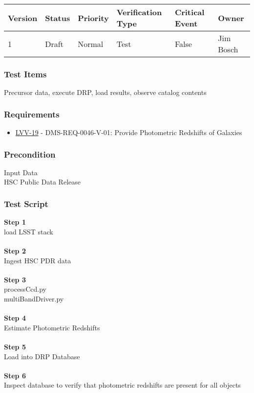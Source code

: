 \begin{longtable}[]{@{}llllll@{}}
\toprule
Version & Status & Priority & Verification Type & Critical Event &
Owner\tabularnewline
\midrule
\endhead
1 & Draft & Normal & Test & False & Jim Bosch\tabularnewline
\bottomrule
\end{longtable}

\hypertarget{test-items-157}{%
\subsubsection{Test Items}\label{test-items-157}}

Precursor data, execute DRP, load results, observe catalog contents

\hypertarget{requirements-158}{%
\subsubsection{Requirements}\label{requirements-158}}

\begin{itemize}
\tightlist
\item
  \href{https://jira.lsstcorp.org/browse/LVV-19}{LVV-19} -
  DMS-REQ-0046-V-01: Provide Photometric Redshifts of Galaxies
\end{itemize}

\hypertarget{precondition-4}{%
\subsubsection{Precondition}\label{precondition-4}}

Input Data\\
HSC Public Data Release

\hypertarget{test-script-158}{%
\subsubsection{Test Script}\label{test-script-158}}

\textbf{Step 1}\\
load LSST stack\\
~\\
\textbf{Step 2}\\
Ingest HSC PDR data\\
~\\
\textbf{Step 3}\\
processCcd.py\\
multiBandDriver.py\\
~\\
\textbf{Step 4}\\
Estimate Photometric Redshifts\\
~\\
\textbf{Step 5}\\
Load into DRP Database\\
~\\
\textbf{Step 6}\\
Inspect database to verify that photometric redshifts are present for
all objects\\
~\\

